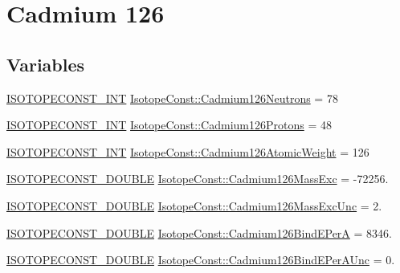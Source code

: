 \hypertarget{group___isotope_const-_cadmium-_cd126}{}\section{Cadmium 126}
\label{group___isotope_const-_cadmium-_cd126}
\subsection*{Variables}
\begin{DoxyCompactItemize}
\item 
\mbox{\hyperlink{group___isotope_const-_macros_ga5f18360b3e99483a35c32d789e62621c}{I\+S\+O\+T\+O\+P\+E\+C\+O\+N\+S\+T\+\_\+\+I\+NT}} \mbox{\hyperlink{group___isotope_const-_cadmium-_cd126_gacbf05a25963d264c39b6ecb0131779f0}{Isotope\+Const\+::\+Cadmium126\+Neutrons}} = 78
\item 
\mbox{\hyperlink{group___isotope_const-_macros_ga5f18360b3e99483a35c32d789e62621c}{I\+S\+O\+T\+O\+P\+E\+C\+O\+N\+S\+T\+\_\+\+I\+NT}} \mbox{\hyperlink{group___isotope_const-_cadmium-_cd126_ga3212f41123f08555e577f4da867f83cd}{Isotope\+Const\+::\+Cadmium126\+Protons}} = 48
\item 
\mbox{\hyperlink{group___isotope_const-_macros_ga5f18360b3e99483a35c32d789e62621c}{I\+S\+O\+T\+O\+P\+E\+C\+O\+N\+S\+T\+\_\+\+I\+NT}} \mbox{\hyperlink{group___isotope_const-_cadmium-_cd126_gaf5d34899b303410076feec50be92367b}{Isotope\+Const\+::\+Cadmium126\+Atomic\+Weight}} = 126
\item 
\mbox{\hyperlink{group___isotope_const-_macros_ga8f45a7272ce02c0b4c65c44636ed719a}{I\+S\+O\+T\+O\+P\+E\+C\+O\+N\+S\+T\+\_\+\+D\+O\+U\+B\+LE}} \mbox{\hyperlink{group___isotope_const-_cadmium-_cd126_ga8ef98c033462195ab3c6aaa695237d1c}{Isotope\+Const\+::\+Cadmium126\+Mass\+Exc}} = -\/72256.
\item 
\mbox{\hyperlink{group___isotope_const-_macros_ga8f45a7272ce02c0b4c65c44636ed719a}{I\+S\+O\+T\+O\+P\+E\+C\+O\+N\+S\+T\+\_\+\+D\+O\+U\+B\+LE}} \mbox{\hyperlink{group___isotope_const-_cadmium-_cd126_ga0171c8f0f24e2a3476bef9e2a32fd310}{Isotope\+Const\+::\+Cadmium126\+Mass\+Exc\+Unc}} = 2.
\item 
\mbox{\hyperlink{group___isotope_const-_macros_ga8f45a7272ce02c0b4c65c44636ed719a}{I\+S\+O\+T\+O\+P\+E\+C\+O\+N\+S\+T\+\_\+\+D\+O\+U\+B\+LE}} \mbox{\hyperlink{group___isotope_const-_cadmium-_cd126_ga8daac1e28976652695e6e03b3beef167}{Isotope\+Const\+::\+Cadmium126\+Bind\+E\+PerA}} = 8346.
\item 
\mbox{\hyperlink{group___isotope_const-_macros_ga8f45a7272ce02c0b4c65c44636ed719a}{I\+S\+O\+T\+O\+P\+E\+C\+O\+N\+S\+T\+\_\+\+D\+O\+U\+B\+LE}} \mbox{\hyperlink{group___isotope_const-_cadmium-_cd126_ga8169ff14b4a02eedaf661eaec0053eda}{Isotope\+Const\+::\+Cadmium126\+Bind\+E\+Per\+A\+Unc}} = 0.

\end{DoxyCompactItemize}
